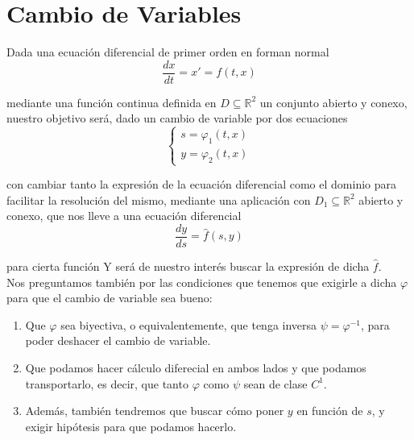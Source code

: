 \newpage
\chapter{Cambio de Variables}
Dada una ecuación diferencial de primer orden en forman normal
\begin{equation*}
    \dfrac{dx}{dt} = x' = f(t,x)
\end{equation*}

mediante una función 
continua definida en $D\subseteq \mathbb{R}^2$ un conjunto abierto y conexo, nuestro objetivo será, dado un cambio de variable por dos ecuaciones
\begin{equation*}
    \left\{\begin{array}{rl}
        s=\varphi_1(t,x) \\
        y = \varphi_2(t,x)
    \end{array}\right.
\end{equation*}

con 
cambiar tanto la expresión de la ecuación diferencial como el dominio para facilitar la resolución del mismo, mediante una aplicación
con $D_1\subseteq \mathbb{R}^2$ abierto y conexo, que nos lleve a una ecuación diferencial
\begin{equation*}
    \dfrac{dy}{ds} = \hat{f} (s,y)
\end{equation*}

para cierta función
Y será de nuestro interés buscar la expresión de dicha $\hat{f}$.\\

Nos preguntamos también por las condiciones que tenemos que exigirle a dicha $\varphi$ para que el cambio de variable sea bueno:
\begin{enumerate}
    \item Que $\varphi$ sea biyectiva, o equivalentemente, que tenga inversa $\psi = \varphi^{-1}$, para poder deshacer el cambio de variable.
    \item Que podamos hacer cálculo diferecial en ambos lados y que podamos transportarlo, es decir, que tanto $\varphi$ como $\psi$ sean de clase $C^1$.
    \item Además, también tendremos que buscar cómo poner $y$ en función de $s$, y exigir hipótesis para que podamos hacerlo.
\end{enumerate}

